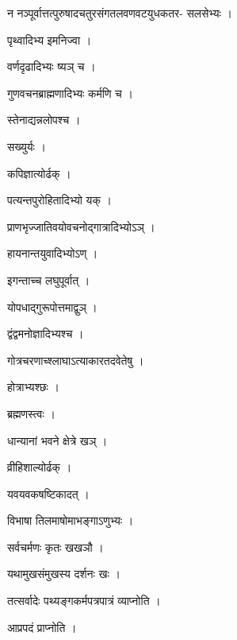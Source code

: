 \documentclass[10pt, openany]{book}
\begin{document}
\noindent न नञ्पूर्वात्तत्पुरुषादचतुरसंगतलवणवटयुधकतर- सलसेभ्यः ।

\noindent पृथ्वादिभ्य इमनिज्वा ।

\noindent वर्णदृढादिभ्यः ष्यञ् च ।

\noindent गुणवचनब्राह्मणादिभ्यः कर्मणि च ।

\noindent स्तेनाद्यन्नलोपश्च ।

\noindent सख्युर्यः ।

\noindent कपिज्ञात्योर्ढक् ।

\noindent पत्यन्तपुरोहितादिभ्यो यक् ।

\noindent प्राणभृज्जातिवयोवचनोद्गात्रादिभ्योऽञ् ।

\noindent हायनान्तयुवादिभ्योऽण् ।

\noindent इगन्ताच्च लघुपूर्वात् ।

\noindent योपधाद्गुरूपोत्तमाद्वुञ् ।

\noindent द्वंद्वमनोज्ञादिभ्यश्च ।

\noindent गोत्रचरणाच्श्लाघाऽत्याकारतदवेतेषु ।

\noindent होत्राभ्यश्छः ।

\noindent ब्रह्मणस्त्वः ।

\noindent धान्यानां भवने क्षेत्रे खञ् ।

\noindent व्रीहिशाल्योर्ढक् ।

\noindent यवयवकषष्टिकादत् ।

\noindent विभाषा तिलमाषोमाभङ्गाऽणुभ्यः ।

\noindent सर्वचर्मणः कृतः खखञौ ।

\noindent यथामुखसंमुखस्य दर्शनः खः ।

\noindent तत्सर्वादेः पथ्यङ्गकर्मपत्रपात्रं व्याप्नोति ।

\noindent आप्रपदं प्राप्नोति ।
\end{document}
